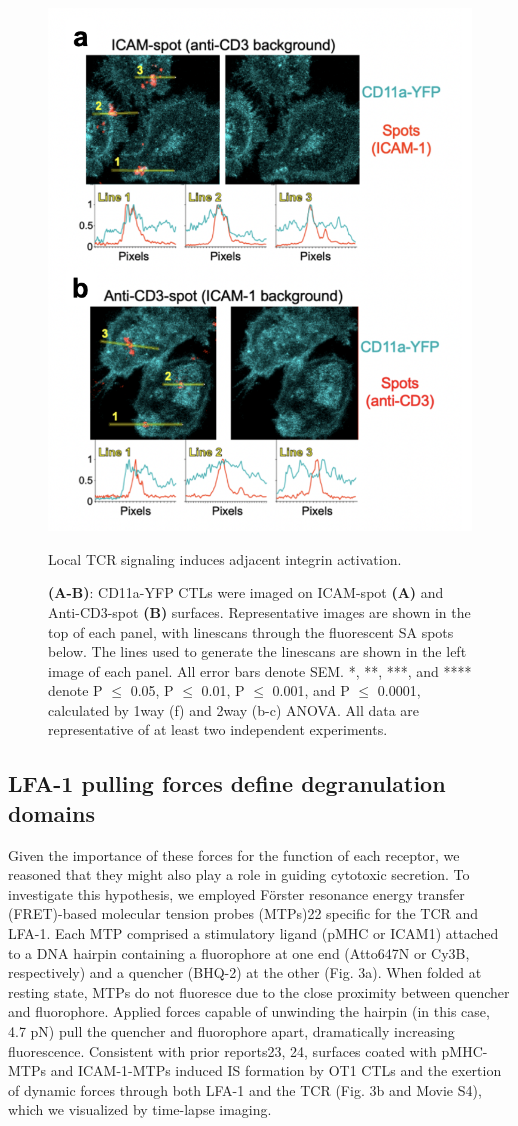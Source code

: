 \begin{figure}[htbp]
	\centering
	\includegraphics[width=0.8\columnwidth]{../figures/chapter3/fig2yfp.png}
	\caption{Local TCR signaling induces adjacent integrin activation.}
	\caption*{\textbf{(A-B)}: CD11a-YFP CTLs were imaged on ICAM-spot \textbf{(A)} and Anti-CD3-spot \textbf{(B)} surfaces. Representative images are shown in the top of each panel, with linescans through the fluorescent SA spots below. The lines used to generate the linescans are shown in the left image of each panel. All error bars denote SEM. *, **, ***, and **** denote P $\leq$ 0.05, P $\leq$ 0.01, P $\leq$ 0.001, and P $\leq$ 0.0001, calculated by 1way
(f) and 2way (b-c) ANOVA. All data are representative of at least two independent experiments.}
	\label{fig:fig2yfp}
\end{figure}

\subsection{LFA-1 pulling forces define degranulation domains}
Given the importance of these forces for the function of each receptor, we reasoned that they might also play a role in guiding cytotoxic secretion. To investigate this hypothesis, we employed F\"{o}rster resonance energy transfer (FRET)-based molecular tension probes (MTPs)22 specific for the TCR and LFA-1. Each MTP comprised a stimulatory ligand (pMHC or ICAM1) attached to a DNA hairpin containing a fluorophore at one end (Atto647N or Cy3B, respectively) and a quencher (BHQ-2) at the other (Fig. 3a). When folded at resting state, MTPs do not fluoresce due to the close proximity between quencher and fluorophore. Applied forces capable of unwinding the hairpin (in this case, 4.7 pN) pull the quencher and fluorophore apart, dramatically increasing fluorescence. Consistent with prior reports23, 24, surfaces coated with pMHC-MTPs and ICAM-1-MTPs induced IS formation by OT1 CTLs and the exertion of dynamic forces through both LFA-1 and the TCR (Fig. 3b and Movie S4), which we visualized by time-lapse imaging. 

